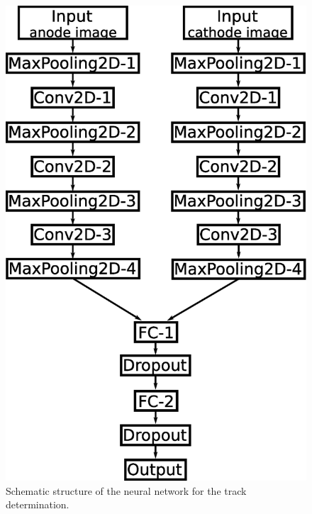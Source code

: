 \documentclass{jps-cp}
\begin{document}
\begin{figure}
\begin{minipage}{0.4\columnwidth}
    \includegraphics[clip, width=0.9\columnwidth]{eps/point_detection_v2.eps}
    \caption{Schematic structure of the neural network for the track determination.}
    \label{fig:extraction}
  \end{minipage}
\end{figure}
\end{document}
